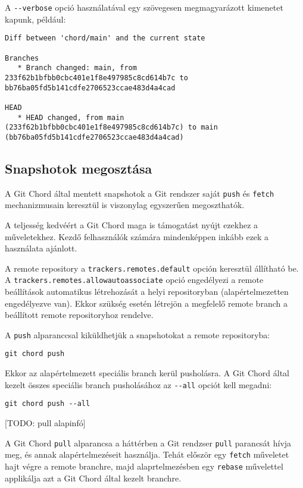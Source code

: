 \documentclass[final]{elteikthesis}[2025/03/25]
\begin{document}
A \verb|--verbose| opció használatával egy szövegesen megmagyarázott kimenetet kapunk, például:

\begin{verbatim}
Diff between 'chord/main' and the current state

Branches
   * Branch changed: main, from 233f62b1bfbb0cbc401e1f8e497985c8cd614b7c to bb76ba05fd5b141cdfe2706523ccae483d4a4cad

HEAD
   * HEAD changed, from main (233f62b1bfbb0cbc401e1f8e497985c8cd614b7c) to main (bb76ba05fd5b141cdfe2706523ccae483d4a4cad)
\end{verbatim}

\subsection{Snapshotok megosztása}

A Git Chord által mentett snapshotok a Git rendszer saját \verb|push| és \verb|fetch|
mechanizmusain keresztül is viszonylag egyszerűen megoszthatók.

A teljesség kedvéért a Git Chord maga is támogatást nyújt ezekhez a műveletekhez.
Kezdő felhasználók számára mindenképpen inkább ezek a használata ajánlott.

A remote repository a \verb|trackers.remotes.default| opción keresztül állítható be.
A \verb|trackers.remotes.allowautoassociate| opció engedélyezi a remote beállítások automatikus
létrehozását a helyi repositoryban (alapértelmezetten engedélyezve van).
Ekkor szükség esetén létrejön a megfelelő remote branch a beállított remote repositoryhoz rendelve.

A \verb|push| alparanccsal kiküldhetjük a snapshotokat a remote repositoryba:

\begin{verbatim}
git chord push
\end{verbatim}

Ekkor az alapértelmezett speciális branch kerül pusholásra.
A Git Chord által kezelt összes speciális branch pusholásához
az \verb|--all| opciót kell megadni:

\begin{verbatim}
git chord push --all
\end{verbatim}

[TODO: pull alapinfó]

A Git Chord \verb|pull| alparancsa a háttérben a Git rendzser \verb|pull| parancsát hívja meg,
és annak alapértelmezéseit használja.
Tehát először egy \verb|fetch| műveletet hajt végre a remote branchre,
majd alaprtelmezésben egy \verb|rebase| művelettel applikálja azt a Git Chord által kezelt branchre.
\end{document}
